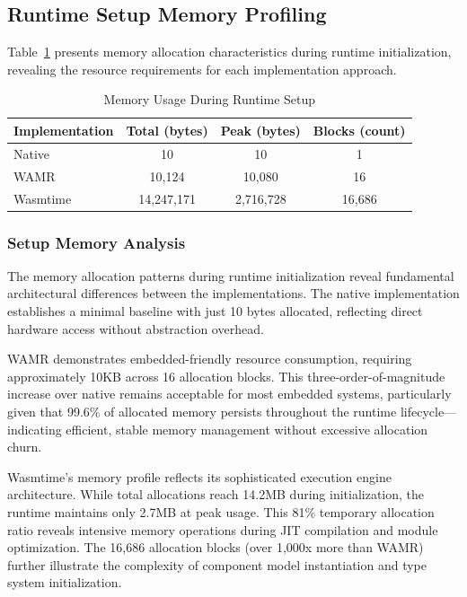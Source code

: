 \subsection{Runtime Setup Memory Profiling}
\label{subsec:memory-setup}

Table~\ref{tab:memory-setup} presents memory allocation characteristics during runtime initialization, revealing the resource requirements for each implementation approach.

\begin{table}[h]
    \centering
    \caption{Memory Usage During Runtime Setup}
    \label{tab:memory-setup}
    \begin{tabular}{lccc}
        \toprule
        \textbf{Implementation} & \textbf{Total (bytes)} & \textbf{Peak (bytes)} & \textbf{Blocks (count)} \\
        \midrule
        Native        & 10          & 10        & 1 \\
        WAMR          & 10,124      & 10,080    & 16 \\
        Wasmtime      & 14,247,171  & 2,716,728 & 16,686 \\
        \bottomrule
    \end{tabular}
\end{table}

\subsubsection{Setup Memory Analysis}

The memory allocation patterns during runtime initialization reveal fundamental architectural differences between the implementations. The native implementation establishes a minimal baseline with just 10 bytes allocated, reflecting direct hardware access without abstraction overhead.

WAMR demonstrates embedded-friendly resource consumption, requiring approximately 10KB across 16 allocation blocks. This three-order-of-magnitude increase over native remains acceptable for most embedded systems, particularly given that 99.6\% of allocated memory persists throughout the runtime lifecycle—indicating efficient, stable memory management without excessive allocation churn.

Wasmtime's memory profile reflects its sophisticated execution engine architecture. While total allocations reach 14.2MB during initialization, the runtime maintains only 2.7MB at peak usage. This 81\% temporary allocation ratio reveals intensive memory operations during JIT compilation and module optimization. The 16,686 allocation blocks (over 1,000x more than WAMR) further illustrate the complexity of component model instantiation and type system initialization.

